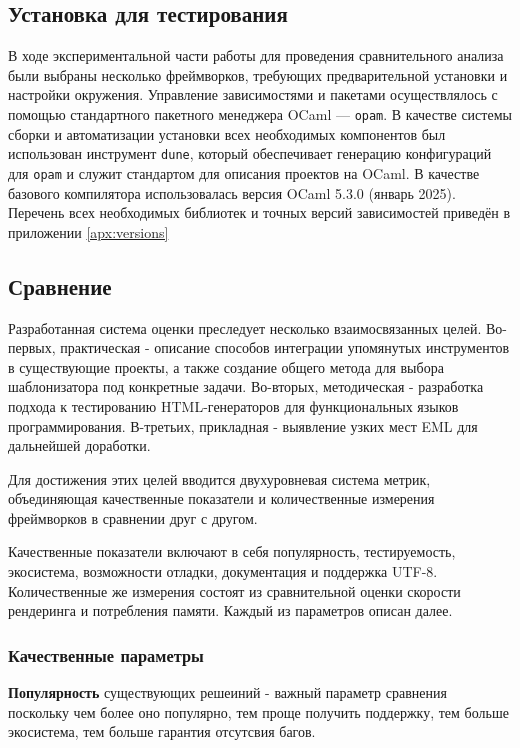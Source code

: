 \subsection{Установка для тестирования}

В ходе экспериментальной части работы для проведения сравнительного анализа были выбраны несколько фреймворков, требующих предварительной установки и настройки окружения.
Управление зависимостями и пакетами осуществлялось с помощью стандартного пакетного менеджера OCaml — \texttt{opam}.
В качестве системы сборки и автоматизации установки всех необходимых компонентов был использован инструмент \texttt{dune}, который обеспечивает генерацию конфигураций для \texttt{opam} и служит стандартом для описания проектов на OCaml.
В качестве базового компилятора использовалась версия OCaml 5.3.0 (январь 2025).
Перечень всех необходимых библиотек и точных версий зависимостей приведён в приложении \ref{apx:versions}

\subsection{Сравнение}

Разработанная система оценки преследует несколько взаимосвязанных целей.
Во-первых, практическая - описание способов интеграции упомянутых инструментов в существующие проекты, а также создание общего метода для выбора шаблонизатора под конкретные задачи.
Во-вторых, методическая - разработка подхода к тестированию HTML-генераторов для функциональных языков программирования.
В-третьих, прикладная - выявление узких мест EML для дальнейшей доработки.

Для достижения этих целей вводится двухуровневая система метрик, объединяющая качественные показатели и количественные измерения фреймворков в сравнении друг с другом.

Качественные показатели включают в себя популярность, тестируемость, экосистема, возможности отладки, документация и поддержка UTF-8.
Количественные же измерения состоят из сравнительной оценки скорости рендеринга и потребления памяти.
Каждый из параметров описан далее.

\subsubsection{Качественные параметры}

\textbf{Популярность} существующих решеиний - важный параметр сравнения поскольку чем более оно популярно, тем проще получить поддержку, тем больше экосистема, тем больше гарантия отсутсвия багов.

